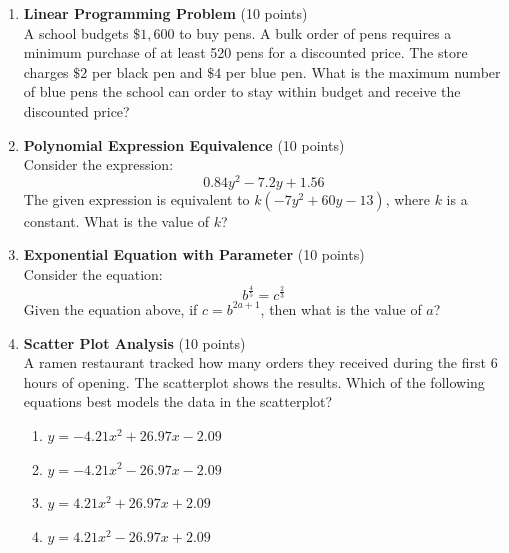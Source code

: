 \begin{enumerate}
  \item \textbf{Linear Programming Problem} (10 points)\\
  A school budgets $\$1,600$ to buy pens. A bulk order of pens requires a minimum purchase of at least 520 pens for a discounted price. The store charges $\$2$ per black pen and $\$4$ per blue pen. What is the maximum number of blue pens the school can order to stay within budget and receive the discounted price?
  \begin{subanswer}
  \end{subanswer}

  \item \textbf{Polynomial Expression Equivalence} (10 points)\\
  Consider the expression:
  \[
    0.84 y^2-7.2 y+1.56
  \]
  The given expression is equivalent to $k\left(-7 y^2+60 y-13\right)$, where $k$ is a constant. What is the value of $k$?
  \begin{subanswer}
  \end{subanswer}

  \item \textbf{Exponential Equation with Parameter} (10 points)\\
  Consider the equation:
  \[
    b^{\frac{4}{5}}=c^{\frac{2}{3}}
  \]
  Given the equation above, if $c=b^{2 a+1}$, then what is the value of $a$?
  \begin{subanswer}
  \end{subanswer}


  \newpage



  \item \textbf{Scatter Plot Analysis} (10 points)\\
  A ramen restaurant tracked how many orders they received during the first 6 hours of opening. The scatterplot shows the results. Which of the following equations best models the data in the scatterplot?
  \begin{enumerate}[label=(\Alph*)]
    \item $y=-4.21 x^2+26.97 x-2.09$
    \item $y=-4.21 x^2-26.97 x-2.09$
    \item $y=4.21 x^2+26.97 x+2.09$
    \item $y=4.21 x^2-26.97 x+2.09$
  \end{enumerate}
  \begin{subanswer}
  \end{subanswer}




\end{enumerate}

